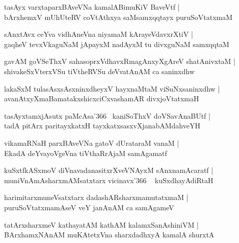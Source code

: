 \documentclass[twoside,12pt,openright]{book}
\newcounter{shloka}[chapter]
\begin{document}
\begin{shloka}%
tasAyx varxtaparxBAveVNa kamalABimuKiV BaveVtf |\\
bArxhemxV mUhUteRV coVtAthxya saMsamxqqtayx puruSoVtatxmaM 
\end{shloka}

\begin{shloka}%
sAnxtAvx ceYva vidhAneVna niyamaM kArayeVdavxrXtiV |\\
gaqheV tevxVkaguNaM jApayxM nadAyxM tu divxguNaM samxqqtaM
\end{shloka}

\begin{shloka}%
gavAM goVSeThxV sahasoprxVdhavxRmagAnxyXgAreV shatAnivxtaM |\\
shivakeSxVterxVSu tiVtheRVSu deVvatAnAM ca saninxdhw 
\end{shloka}

\begin{shloka}%
lakaSxM tulasAsxsAsxninxdheyxV hayxnaMtaM viSuNxsaninxdhw |\\
avanAtxyXmaBamatakxshicxciCxvashamAR divxjoVtatxmaH
\end{shloka}

\begin{shloka}%
tasAyxtamxjAsutx paMcAsa\char'366 ~kaniSoThxV doVSavAnaBUtf |\\
tadA pitArx paritayxkatxH tayxkatxsasxvXjanabAMdahveYH
\end{shloka}

\begin{shloka}%
vikamaRNaH parxBAveVNa gatoV dUrataraM vanaM |\\
EkadA deYvayoVgeVna tiVthaRrAjaM samAgamatf
\end{shloka}

\begin{shloka}%
kuSxtfkASxmoV diVnavadanasitxrXveVNAyxM sAnxnamAcaratf |\\
muniVnAmAsharxmAMsatxtarx vicinavx\char'366 ~ kuSxdhayAdiRtaH 
\end{shloka}

\begin{shloka}%
harimitarxmuneVsatxtarx dadashARsharxmamutatxmaM |\\
puruSoVtatxmamAseV veY janAnAM ca samAgameV 
\end{shloka}

\begin{shloka}%
tatArxsharxmeV kathayatAM kathAM kalamxSanAshiniVM |\\
BArxhamxNAnAM muKAtetxVna sharxdadhxyA kamalA shurxtA 
\end{shloka}
\end{document}
